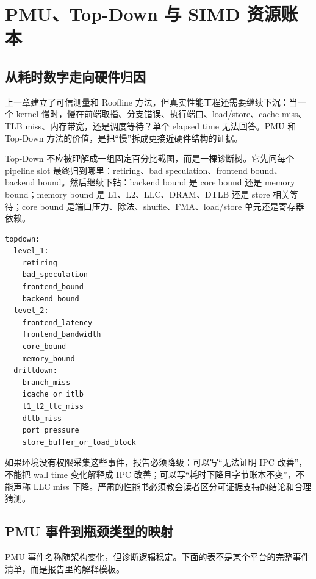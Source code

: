 \chapter{PMU、Top-Down 与 SIMD 资源账本}

\section{从耗时数字走向硬件归因}

上一章建立了可信测量和 Roofline 方法，但真实性能工程还需要继续下沉：当一个 kernel 慢时，慢在前端取指、分支错误、执行端口、load/store、cache miss、TLB miss、内存带宽，还是调度等待？单个 elapsed time 无法回答。PMU 和 Top-Down 方法的价值，是把“慢”拆成更接近硬件结构的证据。

Top-Down 不应被理解成一组固定百分比截图，而是一棵诊断树。它先问每个 pipeline slot 最终归到哪里：retiring、bad speculation、frontend bound、backend bound。然后继续下钻：backend bound 是 core bound 还是 memory bound；memory bound 是 L1、L2、LLC、DRAM、DTLB 还是 store 相关等待；core bound 是端口压力、除法、shuffle、FMA、load/store 单元还是寄存器依赖。

\begin{lstlisting}[numbers=none,caption={Top-Down 诊断树的报告形态}]
topdown:
  level_1:
    retiring
    bad_speculation
    frontend_bound
    backend_bound
  level_2:
    frontend_latency
    frontend_bandwidth
    core_bound
    memory_bound
  drilldown:
    branch_miss
    icache_or_itlb
    l1_l2_llc_miss
    dtlb_miss
    port_pressure
    store_buffer_or_load_block
\end{lstlisting}

如果环境没有权限采集这些事件，报告必须降级：可以写“无法证明 IPC 改善”，不能把 wall time 变化解释成 IPC 改善；可以写“耗时下降且字节账本不变”，不能声称 LLC miss 下降。严肃的性能书必须教会读者区分可证据支持的结论和合理猜测。

\section{PMU 事件到瓶颈类型的映射}

PMU 事件名称随架构变化，但诊断逻辑稳定。下面的表不是某个平台的完整事件清单，而是报告里的解释模板。

